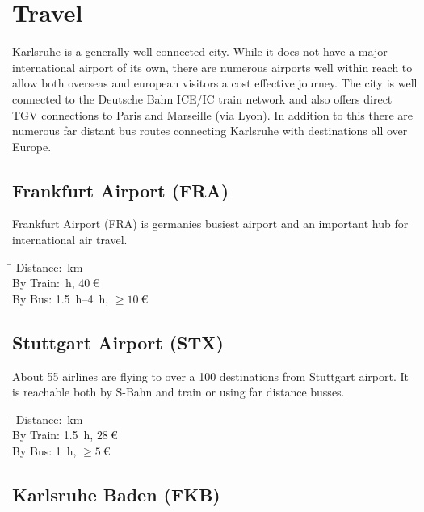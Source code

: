 
\section{Travel}

Karlsruhe is a generally well connected city. While it does not have a major
international airport of its own, there are numerous airports well within reach
to allow both overseas and european visitors a cost effective journey. The city
is well connected to the Deutsche Bahn ICE/IC train network and also offers
direct TGV connections to Paris and Marseille (via Lyon). In addition to this
there are numerous far distant bus routes connecting Karlsruhe with destinations
all over Europe.

\begin{multicols}{2}
\raggedcolumns

\subsection{Frankfurt Airport (FRA)}

Frankfurt Airport (FRA) is germanies busiest airport and an important hub for
international air travel.
\begin{tabbing}
\hspace*{2.5cm} \= \kill
Distance: \,km \\
By Train: \,h, $\SI{40}{\euro}$ \\
By Bus:   \> \SI{1.5}{h}–\SI{4}{h}, $\ge\SI{10}{\euro}$
\end{tabbing}

\subsection{Stuttgart Airport (STX)}

About 55 airlines are flying to over a 100 destinations from Stuttgart airport.
It is reachable both by S-Bahn and train or using far distance busses.

\begin{tabbing}
\hspace*{2.5cm} \= \kill
Distance: \,km \\
By Train: \> \SI{1.5}{\hour}, $\SI{28}{\euro}$ \\
By Bus:   \> \SI{1}{\hour}, $\ge\SI{5}{\euro}$
\end{tabbing}

\subsection{Karlsruhe Baden (FKB)}


\end{multicols}
